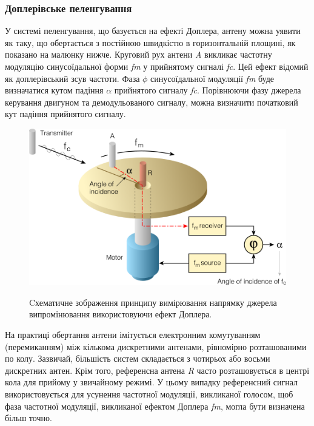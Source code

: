 \documentclass{article}
\begin{document}
\subsubsection{Доплерівське пеленгування}
У системі пеленгування, що базується на ефекті Доплера, антену можна уявити як таку, що обертається з постійною швидкістю в горизонтальній площині, як показано на малюнку нижче. Круговий рух антени \textit{A} викликає частотну модуляцію синусоїдальної форми \textit{fm} у прийнятому сигналі \textit{fc}. Цей ефект відомий як доплерівський зсув частоти. Фаза $\phi$ синусоїдальної модуляції \textit{fm} буде визначатися кутом падіння $\alpha$ прийнятого сигналу \textit{fc}. Порівнюючи фазу джерела керування двигуном та демодульованого сигналу, можна визначити початковий кут падіння прийнятого сигналу.

\begin{figure}[H]
\centering
{\includegraphics[width=0.6\linewidth]{images/rdf-dopler.png}}
\caption{\label{fig:rdf:dopler}Cхематичне зображення принципу вимірювання напрямку джерела випромінювання використовуючи ефект Доплера.}
\end{figure}

На практиці обертання антени імітується електронним комутуванням (перемиканням) між кількома дискретними антенами, рівномірно розташованими по колу. Зазвичай, більшість систем складається з чотирьох або восьми дискретних антен. Крім того, референсна антена \textit{R} часто розташовується в центрі кола для прийому у звичайному режимі. У цьому випадку референсний сигнал використовується для усунення частотної модуляції, викликаної голосом, щоб фаза частотної модуляції, викликаної ефектом Доплера \textit{fm}, могла бути визначена більш точно.
\end{document}
